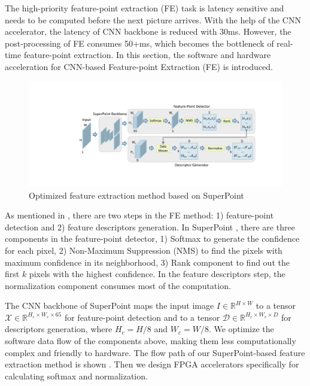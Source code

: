 \label{sec:hardsoftcodesign}
\label{subsec:FEopt}

The high-priority feature-point extraction (FE) task is latency sensitive and needs to be computed before the next picture arrives. With the help of the CNN accelerator, the latency of CNN backbone is reduced with 30ms. However, the  post-processing of FE consumes 50+ms, which becomes the bottleneck of real-time feature-point extraction. In this section, the software and hardware acceleration for CNN-based Feature-point Extraction (FE) is introduced.


\begin{figure}[t]
    \centering  
    \includegraphics[width=0.9\linewidth]{fig/superpoint.pdf}
    \caption{Optimized feature extraction method based on SuperPoint}
    \label{fig:superpoint}
\end{figure}

As mentioned in , there are two steps in the FE method: 1) feature-point detection and 2) feature descriptors generation. 
In SuperPoint \cite{detone2018superpoint}, there are three components in the feature-point detector, 1) Softmax to generate the confidence for each pixel, 2) Non-Maximum Suppression (NMS) to find the pixels with maximum confidence in its neighborhood, 3) Rank component to find out the first $k$ pixels with the highest confidence. 
In the feature descriptors step, the normalization component consumes most of the computation. 

The CNN backbone of SuperPoint maps the input image $I\in \mathbb{R}^{H\times W}$ to a tensor $\mathcal{X}\in \mathbb{R}^{H_c\times W_c\times 65}$ for feature-point detection and to a tensor $\mathcal{D}\in \mathbb{R}^{H_c\times W_c\times D}$ for descriptors generation, where $H_c = H/8$ and $W_c = W/8$.
We optimize the software data flow of the components above, making them less computationally complex and friendly to hardware. 
The flow path of our SuperPoint-based feature extraction method is shown . 
Then we design FPGA accelerators specifically for calculating softmax and normalization.

